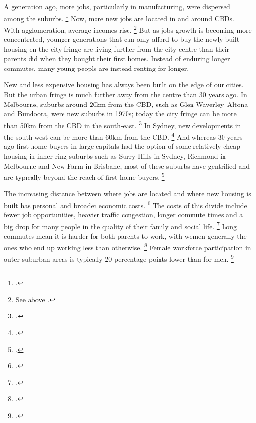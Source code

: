 A generation ago, more jobs, particularly in manufacturing, were dispersed among the suburbs.%
	\footcite{KellyDonegan2015-City-limits}
Now, more new jobs are located in and around CBDs.
With agglomeration, average incomes rise.%
	\footnote{See above .}
But as jobs growth is becoming more concentrated, younger generations that can only afford to buy the newly built housing on the city fringe are living further from the city centre than their parents did when they bought their first homes.
Instead of enduring longer commutes, many young people are instead renting for longer.

New and less expensive housing has always been built on the edge of our cities.
But the urban fringe is much further away from the centre than 30 years ago.
In Melbourne, suburbs around 20km from the CBD, such as Glen Waverley, Altona and Bundoora, were new suburbs in 1970s; today the city fringe can be more than 50km from the CBD in the south-east.%
	\footcite[][Map~1]{VicGovPlanMelb2017}
In Sydney, new developments in the south-west can be more than 60km from the CBD.%
	\footcites[][Figure~2]{NSW-DPE-2014-Plan-for-growing-Syd}{Transport-Sydney-2014-Sydneys-urban-growth-history}
And whereas 30 years ago first home buyers in large capitals had the option of some relatively cheap housing in inner-ring suburbs such as Surry Hills in Sydney, Richmond in Melbourne and New Farm in Brisbane, most of these suburbs have gentrified and are typically beyond the reach of first home buyers.%
	\footcites{coffee-visualising-pop-change}[][19--20]{KellyMaresHarrisonEtAl2013}

The increasing distance between where jobs are located and where new housing is built has personal and broader economic costs.%
	\footnote{\textcites{KellyDonegan2015-City-limits}{NBER2017HsiehMoretti}{Cheshireetal_2018_empty_homes}.} 
The costs of this divide include fewer job opportunities, heavier traffic congestion, longer commute times and a big drop for many people in the quality of their family and social life.%
	\footcites{KellyDonegan2015-City-limits}{Ryan-Selim-2017-theConvo-Liveable-Sydney-has-clear-winners-and-losers}[][1]{Pawson-et-al-2015-Addressing}{IA_2018_Future_cities}
Long commutes mean it is harder for both parents to work, with women generally the ones who end up working less than otherwise.%
	\footcite{Daley-2015-Guardian-Inner-city-v-outer-suburbs-where-you-live-really-does-determine-what-you-get}
Female workforce participation in outer suburban areas is typically 20 percentage points lower than for men.%
	\footcite{KellyMaresHarrisonEtAl2013}

